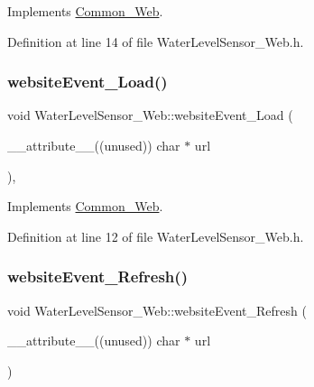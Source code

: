 Implements \hyperlink{class_common___web_a898e3fd8cc6384ecbbbd79c8a3a13b62}{Common\+\_\+\+Web}.



Definition at line 14 of file Water\+Level\+Sensor\+\_\+\+Web.\+h.

\mbox{\label{class_water_level_sensor___web_af4ed210d015bfc044c0c8398bdf6b21e}} 
\subsubsection{\texorpdfstring{website\+Event\+\_\+\+Load()}{websiteEvent\_Load()}}
{\footnotesize\ttfamily void Water\+Level\+Sensor\+\_\+\+Web\+::website\+Event\+\_\+\+Load (\begin{DoxyParamCaption}\item[{\+\_\+\+\_\+attribute\+\_\+\+\_\+((unused)) char $\ast$}]{url }\end{DoxyParamCaption})\hspace{0.3cm}{\ttfamily [inline]}, {\ttfamily [virtual]}}



Implements \hyperlink{class_common___web_a5ce0d5ce6f63279c3b624371d8a76211}{Common\+\_\+\+Web}.



Definition at line 12 of file Water\+Level\+Sensor\+\_\+\+Web.\+h.

\mbox{\label{class_water_level_sensor___web_a8caf8178b0128bad72e78c1c662af5c0}} 
\subsubsection{\texorpdfstring{website\+Event\+\_\+\+Refresh()}{websiteEvent\_Refresh()}}
{\footnotesize\ttfamily void Water\+Level\+Sensor\+\_\+\+Web\+::website\+Event\+\_\+\+Refresh (\begin{DoxyParamCaption}\item[{\+\_\+\+\_\+attribute\+\_\+\+\_\+((unused)) char $\ast$}]{url }\end{DoxyParamCaption})\hspace{0.3cm}{\ttfamily [virtual]}}




